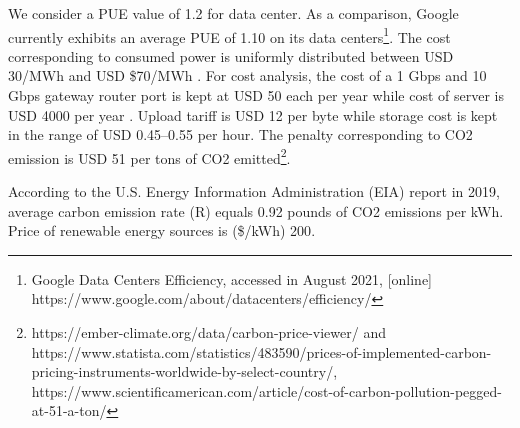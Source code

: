 \documentclass[twocolumn]{article}
\begin{document}
\par We consider a PUE value of 1.2 for data center. As a comparison, Google currently exhibits an average PUE of 1.10 on its data centers\footnote{Google Data Centers Efficiency, accessed in August 2021, [online] https://www.google.com/about/datacenters/efficiency/}. The cost corresponding to consumed power is uniformly distributed between USD 30/MWh and USD \$70/MWh \cite{wu2015cloud}. For cost analysis, the cost of a 1 Gbps and 10 Gbps gateway router port is kept at USD 50 each per year while cost of server is USD 4000 per year \cite{wu2015cloud}. Upload tariff is USD 12 per byte while storage cost is kept in the range of USD 0.45–0.55 per hour\cite{hussain2019fog}. The penalty corresponding to CO2 emission is USD 51 per tons of CO2 emitted\footnote{https://ember-climate.org/data/carbon-price-viewer/ and https://www.statista.com/statistics/483590/prices-of-implemented-carbon-pricing-instruments-worldwide-by-select-country/, https://www.scientificamerican.com/article/cost-of-carbon-pollution-pegged-at-51-a-ton/}.
\par According to the U.S. Energy Information Administration (EIA) report in 2019, average carbon emission rate (R) equals 0.92 pounds of CO2 emissions per kWh. Price of renewable energy sources is (\$/kWh) 200\cite{li2017balancing}.

\end{document}
